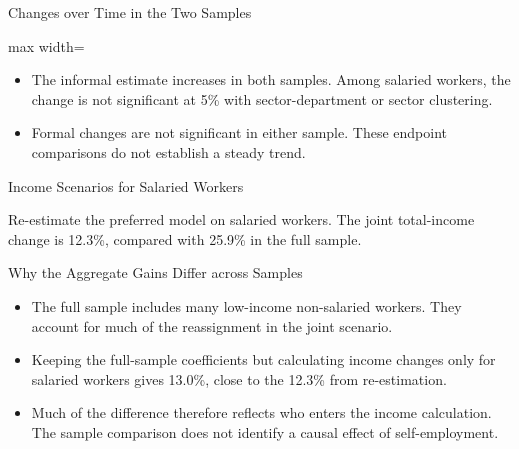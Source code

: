 \begin{frame}{Changes over Time in the Two Samples}
  \centering\small
  \begin{adjustbox}{max width=\textwidth}
    
  \end{adjustbox}
  \par\vspace{0.3cm}
  \begin{itemize}
    \item The informal estimate increases in both samples. Among salaried workers, the change is not significant at 5\% with sector-department or sector clustering.
    \item Formal changes are not significant in either sample. These endpoint comparisons do not establish a steady trend.
  \end{itemize}
\end{frame}

\begin{frame}{Income Scenarios for Salaried Workers}
  \centering\small
  \setlength{\tabcolsep}{4pt}
  
  \par\vspace{0.3cm}
  {\small Re-estimate the preferred model on salaried workers. The joint total-income change is 12.3\%, compared with 25.9\% in the full sample.\par}
\end{frame}

\begin{frame}{Why the Aggregate Gains Differ across Samples}
  \begin{itemize}
    \item The full sample includes many low-income non-salaried workers. They account for much of the reassignment in the joint scenario.
    \item Keeping the full-sample coefficients but calculating income changes only for salaried workers gives 13.0\%, close to the 12.3\% from re-estimation.
    \item Much of the difference therefore reflects who enters the income calculation. The sample comparison does not identify a causal effect of self-employment.
  \end{itemize}
\end{frame}

